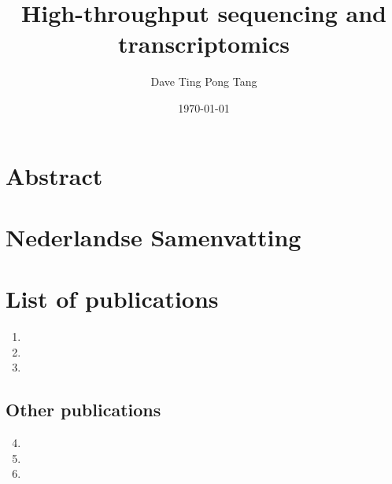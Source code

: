 \documentclass[10pt,a4paper]{report}
\begin{document}
%

\title{
   {High-throughput sequencing and transcriptomics}
}

\author{Dave Ting Pong Tang}
\date{\today}
\maketitle

%

\chapter*{Abstract}


\chapter*{Nederlandse Samenvatting}


\chapter*{List of publications}

\begin{enumerate}
   \item {}
   \item {}
   \item {}
\end{enumerate}

\section*{Other publications}

\begin{enumerate}
   \setcounter{enumi}{3}
   \item {}
   \item {}
   \item {}
\end{enumerate}

\tableofcontents
\listoffigures
\listoftables
\end{document}
